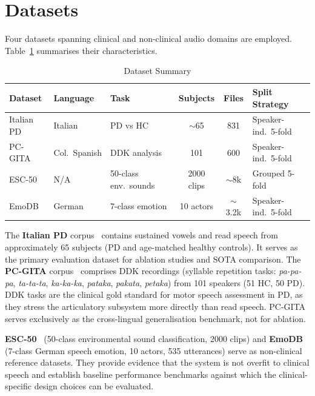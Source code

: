 \documentclass[oneside,openany]{final_report}
\begin{document}
\section{Datasets}

Four datasets spanning clinical and non-clinical audio domains are employed. Table~\ref{tab:datasets} summarises their characteristics.

\begin{table}[H]
\centering
\caption{Dataset Summary}
\label{tab:datasets}
\small
\begin{tabularx}{\textwidth}{l l l c c X}
\toprule
\textbf{Dataset} & \textbf{Language} & \textbf{Task} & \textbf{Subjects} & \textbf{Files} & \textbf{Split Strategy} \\
\midrule
Italian PD & Italian & PD vs HC & $\sim$65 & 831 & Speaker-ind.\ 5-fold \\
PC-GITA & Col.\ Spanish & DDK analysis & 101 & 600 & Speaker-ind.\ 5-fold \\
ESC-50 & N/A & 50-class env.\ sounds & 2000 clips & $\sim$8k & Grouped 5-fold \\
EmoDB & German & 7-class emotion & 10 actors & $\sim$3.2k & Speaker-ind.\ 5-fold \\
\bottomrule
\end{tabularx}
\end{table}

The \textbf{Italian PD} corpus~\cite{dimauro2019} contains sustained vowels and read speech from approximately 65 subjects (PD and age-matched healthy controls). It serves as the primary evaluation dataset for ablation studies and SOTA comparison. The \textbf{PC-GITA} corpus~\cite{orozco2014} comprises DDK recordings (syllable repetition tasks: \textit{pa-pa-pa}, \textit{ta-ta-ta}, \textit{ka-ka-ka}, \textit{pataka}, \textit{pakata}, \textit{petaka}) from 101 speakers (51 HC, 50 PD). DDK tasks are the clinical gold standard for motor speech assessment in PD, as they stress the articulatory subsystem more directly than read speech. PC-GITA serves exclusively as the cross-lingual generalisation benchmark, not for ablation.

\textbf{ESC-50}~\cite{piczak2015} (50-class environmental sound classification, 2000 clips) and \textbf{EmoDB}~\cite{burkhardt2005} (7-class German speech emotion, 10 actors, 535 utterances) serve as non-clinical reference datasets. They provide evidence that the system is not overfit to clinical speech and establish baseline performance benchmarks against which the clinical-specific design choices can be evaluated.
\end{document}
